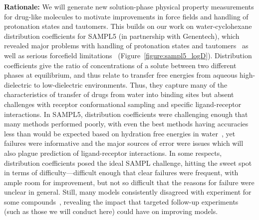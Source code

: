\documentclass[11pt]{article}
\begin{document}
{\bf Rationale:}
We will generate new solution-phase physical property measurements for drug-like molecules to motivate improvements in force fields and handling of protonation states and tautomers.
This builds on our work on water-cyclohexane distribution coefficients for SAMPL5 (in partnership with Genentech), which revealed major problems with handling of protonation states and tautomers~\cite{bannan_blind_2016}  as well as serious forcefield limitations~\cite{paranahewage_predicting_2016} (Figure~\ref{figure:sampl5_logD}).
Distribution coefficients give the ratio of concentrations of a solute between two different phases at equilibrium, and thus relate to transfer free energies from aqueous high-dielectric to low-dielectric environments.
Thus, they capture many of the characteristics of transfer of drugs from water into binding sites but absent challenges with receptor conformational sampling and specific ligand-receptor interactions.
In SAMPL5, distribution coefficients were challenging enough that many methods performed poorly, with even the best methods having accuracies less than would be expected based on hydration free energies in water~\cite{bannan_blind_2016}, yet failures were informative and the major sources of error were issues which will also plague prediction of ligand-receptor interactions.
In some respects, distribution coefficients posed the ideal SAMPL challenge, hitting the sweet spot in terms of difficulty---difficult enough that clear failures were frequent, with ample room for improvement, but not so difficult that the reasons for failure were unclear in general. 
Still, many models consistently disagreed with experiment for some compounds~\cite{paranahewage_predicting_2016, klamt_prediction_2016, bannan_blind_2016, rustenburg_measuring_2016}, revealing the impact that targeted follow-up experiments (such as those we will conduct here) could have on improving models.
\end{document}
